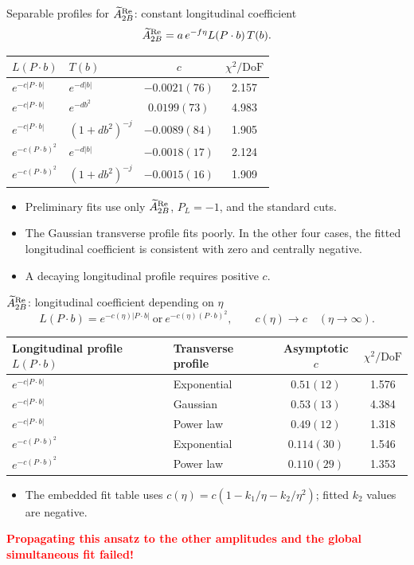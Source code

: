 \begin{frame}{Separable profiles for $\widetilde{A}_{2B}^{\text{Re}}$: constant longitudinal coefficient}
\small
\[\widetilde{A}_{2B}^{\text{Re}}=a\,e^{-f\eta}L(P\cdot b)\,T(b).\]
\centering\renewcommand{\arraystretch}{1.5}
\begin{tabular}{llcc}
\toprule $L(P\cdot b)$ & $T(b)$ & $c$ & $\chi^2/\mathrm{DoF}$ \\
\midrule
$e^{-c|P\cdot b|}$ & $e^{-d|b|}$ & $-0.0021(76)$ & 2.157 \\
$e^{-c|P\cdot b|}$ & $e^{-db^2}$ & $0.0199(73)$ & 4.983 \\
$e^{-c|P\cdot b|}$ & $(1+db^2)^{-j}$ & $-0.0089(84)$ & 1.905 \\
$e^{-c(P\cdot b)^2}$ & $e^{-d|b|}$ & $-0.0018(17)$ & 2.124 \\
$e^{-c(P\cdot b)^2}$ & $(1+db^2)^{-j}$ & $-0.0015(16)$ & 1.909 \\
\bottomrule\end{tabular}
\begin{itemize}
\item Preliminary fits use only $\widetilde{A}_{2B}^{\text{Re}}$, $P_L=-1$, and the standard cuts.
\item The Gaussian transverse profile fits poorly. In the other four cases, the fitted longitudinal coefficient is consistent with zero and centrally negative.
\item A decaying longitudinal profile requires positive $c$.
\end{itemize}
\end{frame}

\begin{frame}{$\widetilde{A}_{2B}^{\text{Re}}$: longitudinal coefficient depending on $\eta$}
\small
\[ L(P\cdot b)=e^{-c(\eta)|P\cdot b|}\ \text{or}\ e^{-c(\eta)(P\cdot b)^2},\qquad c(\eta)\longrightarrow c\quad(\eta\to\infty).\]
\centering\renewcommand{\arraystretch}{1.5}
\begin{tabular}{llcc}
\toprule Longitudinal profile $L(P\cdot b)$ & Transverse profile & Asymptotic $c$ & $\chi^2/\mathrm{DoF}$ \\
\midrule
$e^{-c|P\cdot b|}$ & Exponential & $0.51(12)$ & 1.576 \\
$e^{-c|P\cdot b|}$ & Gaussian & $0.53(13)$ & 4.384 \\
$e^{-c|P\cdot b|}$ & Power law & $0.49(12)$ & 1.318 \\
$e^{-c(P\cdot b)^2}$ & Exponential & $0.114(30)$ & 1.546 \\
$e^{-c(P\cdot b)^2}$ & Power law & $0.110(29)$ & 1.353 \\
\bottomrule\end{tabular}
\begin{itemize}
\item The embedded fit table uses $c(\eta)=c(1-k_1/\eta-k_2/\eta^2)$; fitted $k_2$ values are negative.
\end{itemize}
\vspace{2mm}
\centering\textbf{\textcolor{red}{Propagating this ansatz to the other amplitudes and the global simultaneous fit failed!}}
\end{frame}

